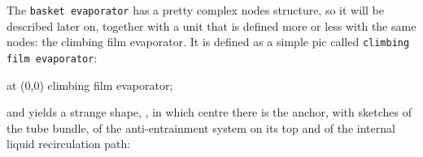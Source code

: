 \documentclass[12pt]{article}						%
\newcommand*{\chpn}[1]{\texttt{#1}}				%
\newcommand*{\chpp}[1]{\texttt{#1}}				%
\begin{document}
The \chpp{basket evaporator} has a pretty complex nodes structure, so it will be
described later on, together with a unit that is defined  more or less with the
same nodes: the climbing film evaporator. It is defined as a simple pic called
\chpp{climbing film evaporator}:
\begin{chpcode}
	\pic at (0,0) {climbing film evaporator};
\end{chpcode}
and yields a strange shape, , in which centre there is the anchor, with sketches
of the tube bundle, of the anti-entrainment system on its top and of the internal
liquid recirculation path:
\begin{center}
\end{center}
\end{document}
